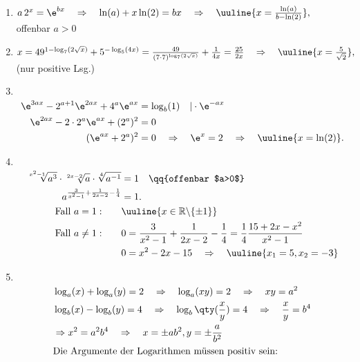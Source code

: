 \begin{enumerate}[label=(\alph*)]
    \item $a\,2^x=\e^{bx} \quad \Rightarrow \quad \ln(a)+x\ln(2) = bx \quad \Rightarrow \quad \uuline{x = \frac{\ln(a)}{b-\ln(2)}},\quad$ offenbar $a>0$
    \item $x=49^{1-\log_7(2\sqrt{x})}+5^{-\log_5(4x)} = \frac{49}{(7\cdot 7)^{\log_7(2\sqrt{x})}} + \frac{1}{4x} = \frac{25}{2x} \quad \Rightarrow \quad \uuline{x = \frac{5}{\sqrt{2}}},\quad$ (nur positive Lsg.)
    \item$~$\\[-1.4cm]
    \begin{align}
        \e^{3ax}-2^{a+1}\e^{2ax}+4^a\e^{ax} &=\log_b(1) \quad |\cdot \e^{-ax} \\
        \e^{2ax} - 2\cdot 2^a \e^{ax} + (2^a)^2 &= 0 \\
        (\e^{ax}+2^a)^2 &= 0  \quad \Rightarrow \quad \e^x = 2 \quad \Rightarrow \quad \uuline{x = \ln(2)}.
    \end{align}
    \item$~$\\[-1.4cm]
    \begin{align}
        \sqrt[x^2-1]{a^3}\cdot\sqrt[2x-2]{a}\cdot\sqrt[4]{a^{-1}} &=1 \quad \qq{offenbar $a>0$} \\
        a^{\frac{3}{x^2-1} + \frac{1}{2x-2} - \frac{1}{4}} &= 1. \\
        \text{Fall } a=1: \qquad & \uuline{x \in \mathbb{R}\backslash \{\pm 1\}} \\
        \text{Fall } a\neq 1: \qquad & 0=\frac{3}{x^2-1} + \frac{1}{2x-2} - \frac{1}{4} = \frac{1}{4} \frac{15+ 2x-x^2}{x^2-1} \\
        &0 = x^2 -2x-15 \quad \Rightarrow \quad \uuline{x_1 =5, x_2 = -3}
    \end{align}
    \item$~$\\[-1.4cm]
    \begin{align}
        &\log_a(x) + \log_a(y) = 2 \quad\Rightarrow\quad \log_a(xy) = 2 \quad\Rightarrow\quad xy = a^2 \\
        &\log_b(x) - \log_b(y) =4 \quad\Rightarrow\quad \log_b\qty(\frac{x}{y}) = 4 \quad \Rightarrow \quad \frac{x}{y} = b^4\\
        &\Rightarrow x^2 = a^2 b^4 \quad \Rightarrow \quad x = \pm ab^2, y = \pm \frac{a}{b^2}\\
        &\text{Die Argumente der Logarithmen müssen positiv sein:}\\

\end{align}
\end{enumerate}
